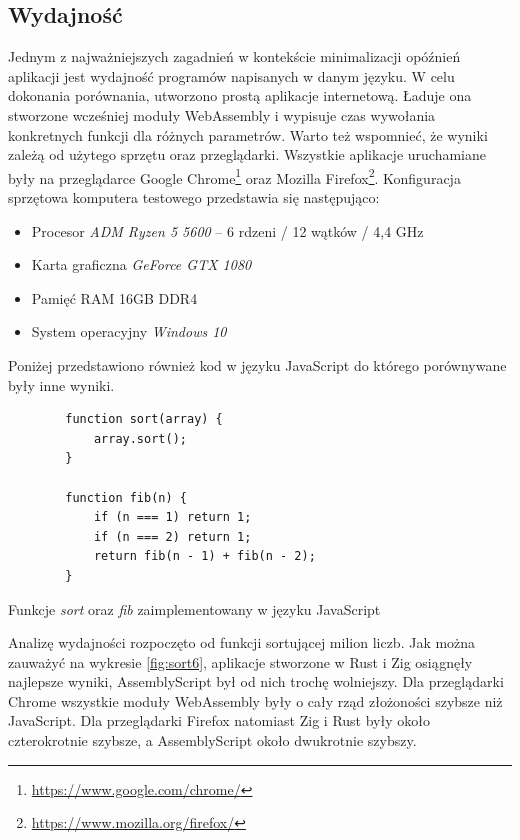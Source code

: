 \documentclass[language=polish,type=master]{aghmodern}
\begin{document}
\subsection{Wydajność}
Jednym z najważniejszych zagadnień w kontekście minimalizacji opóźnień aplikacji jest wydajność programów napisanych w danym języku.
W celu dokonania porównania, utworzono prostą aplikacje internetową.
Ładuje ona stworzone wcześniej moduły WebAssembly i wypisuje czas wywołania konkretnych funkcji dla różnych parametrów.
Warto też wspomnieć, że wyniki zależą od użytego sprzętu oraz przeglądarki.
Wszystkie aplikacje uruchamiane były na przeglądarce Google Chrome\footnote{\url{https://www.google.com/chrome/}} oraz Mozilla Firefox\footnote{\url{https://www.mozilla.org/firefox/}}.
Konfiguracja sprzętowa komputera testowego przedstawia się następująco:
\begin{itemize}
    \itemsep0em
    \item Procesor \emph{ADM Ryzen 5 5600} -- 6 rdzeni / 12 wątków / 4,4 GHz
    \item Karta graficzna \emph{GeForce GTX 1080}
    \item Pamięć RAM 16GB DDR4
    \item System operacyjny \emph{Windows 10}
\end{itemize}

Poniżej przedstawiono również kod w języku JavaScript do którego porównywane były inne wyniki.

\begin{listing}[H]
    \begin{verbatim}
        function sort(array) {
            array.sort();
        }

        function fib(n) {
            if (n === 1) return 1;
            if (n === 2) return 1;
            return fib(n - 1) + fib(n - 2); 
        }
    \end{verbatim}
    \caption{Funkcje \emph{sort} oraz \emph{fib} zaimplementowany w języku JavaScript}
\end{listing}

Analizę wydajności rozpoczęto od funkcji sortującej milion liczb.
Jak można zauważyć na wykresie \ref{fig:sort6}, aplikacje stworzone w Rust i Zig osiągnęły najlepsze wyniki, AssemblyScript był od nich trochę wolniejszy.
Dla przeglądarki Chrome wszystkie moduły WebAssembly były o cały rząd złożoności szybsze niż JavaScript.
Dla przeglądarki Firefox natomiast Zig i Rust były około czterokrotnie szybsze, a AssemblyScript około dwukrotnie szybszy.
\end{document}
